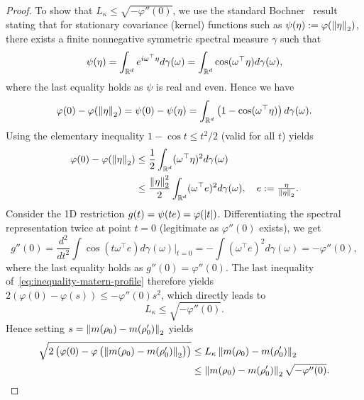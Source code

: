 \begin{proof}
To show that $L_\kappa \leq \sqrt{-\varphi''(0)}$, we use the standard Bochner~\cite{Hofmann_Schölkopf_Smola_2008} result stating that for stationary covariance (kernel) functions such as $\psi(\eta) := \varphi(\left\lVert\eta\right\rVert_{2})$, there exists a finite nonnegative symmetric spectral measure $\gamma$ such that 
\begin{equation*}
    \psi(\eta) = \int_{{\mathbb{R}}^d} e^{i \omega^\top \eta} d\gamma(\omega) = \int_{{\mathbb{R}}^d} \cos(\omega^\top \eta) d\gamma(\omega),
\end{equation*}
where the last equality holds as $\psi$ is real and even. Hence we have
\begin{equation*}
    \varphi(0) - \varphi(\left\lVert\eta\right\rVert_{2}) = \psi(0) - \psi(\eta) = \int_{{\mathbb{R}}^d} \left(1 - \cos(\omega^\top \eta)\right) d\gamma(\omega).
\end{equation*}
Using the elementary inequality $1- \cos t \leq t^2/2$ (valid for all $t$) yields
\begin{equation}\label{eq:inequality-matern-profile}
\begin{aligned}
    \varphi(0) - \varphi(\left\lVert\eta\right\rVert_{2}) &\leq \frac{1}{2} \int_{{\mathbb{R}}^d} (\omega^\top \eta)^2 d\gamma(\omega)\\
    &\leq \frac{\left\lVert\eta\right\rVert_{2}^2}{2} \int_{{\mathbb{R}}^d} (\omega^\top e)^2 d\gamma(\omega), \quad e := \tfrac{\eta}{\left\lVert\eta\right\rVert_{2}}.
\end{aligned}
\end{equation}
Consider the 1D restriction $g(t) = \psi(t e) = \varphi(\left| t \right|)$. Differentiating the spectral representation twice at point $t = 0$ (legitimate as $\varphi''(0)$ exists), we get
\begin{equation*}
    g''(0) = \frac{d^2}{dt^2} \int \cos(t \omega^\top e) d\gamma(\omega) \bigg|_{t=0} = - \int (\omega^\top e)^2 d\gamma(\omega) = - \varphi''(0),
\end{equation*}
where the last equality holds as $g''(0) = \varphi''(0)$. The last inequality of~\cref{eq:inequality-matern-profile} therefore yields $2 (\varphi(0)-\varphi(s)) \leq -\varphi''(0) s^2$, which directly leads to
\begin{equation}\label{eq:L-kappa-bound}
    L_\kappa  \leq \sqrt{-\varphi''(0)}.
\end{equation}
Hence setting $s = \left\lVert m(\rho_0) - m(\rho'_0)\right\rVert_{2}$ yields
\begin{equation*}
\begin{aligned}
    \sqrt{2 \left(\varphi(0) - \varphi\left(\left\lVert m(\rho_0) - m(\rho'_0)\right\rVert_{2}\right)\right)} &\leq L_\kappa \left\lVert m(\rho_0) - m(\rho'_0)\right\rVert_{2} \\
    &\leq \left\lVert m(\rho_0) - m(\rho'_0)\right\rVert_{2} \sqrt{-\varphi''(0)}.
\end{aligned}
\end{equation*}


\end{proof}
